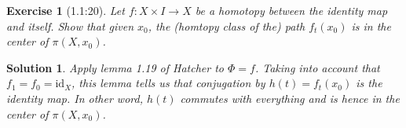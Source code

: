 \documentclass{article}
\theoremstyle{plain}
\newtheorem*{ex}{Exercise}
\theoremstyle{nonumberplain}
\newtheorem{sol}{Solution}
\newcommand{\id}{\mathrm{id}}
\begin{document}
\begin{ex}[1.1:20]
Let $f \colon X \times I \to X$ be a homotopy between the identity map and itself. Show that given $x_0$, the (homtopy class of the) path $f_t(x_0)$ is in the center of $\pi(X,x_0)$.
\end{ex}

\begin{sol}
Apply lemma 1.19 of Hatcher to $\Phi = f$. Taking into account that $f_1 = f_0 = \id_X$, this lemma tells us that conjugation by $h(t) = f_t(x_0)$ is the identity map. In other word, $h(t)$ commutes with everything and is hence in the center of $\pi(X,x_0)$.
\end{sol}
\end{document}

